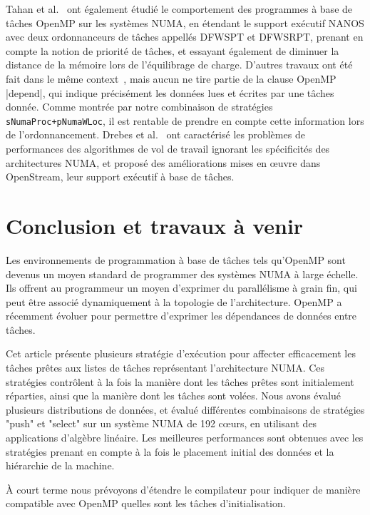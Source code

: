 \documentclass[parallelisme]{compas2016}
\begin{document}
Tahan et al.~\cite{DBLP:journals/corr/Tahan14} ont également étudié le comportement
des programmes à base de tâches OpenMP sur les systèmes NUMA, en étendant le
support exécutif NANOS avec deux ordonnanceurs de tâches appellés DFWSPT et DFWSRPT,
prenant en compte la notion de priorité de tâches, et essayant également de diminuer
la distance de la mémoire lors de l'équilibrage de charge.
D'autres travaux ont été fait dans le même context~\cite{DBLP:conf/europar/TerbovenSCM12,DBLP:journals/corr/abs-1101-0093},
mais aucun ne tire partie de la clause OpenMP |depend|, qui indique précisément les
données lues et écrites par une tâches donnée. Comme montrée par notre combinaison
de stratégies \verb/sNumaProc+pNumaWLoc/, il est rentable de prendre en compte
cette information lors de l'ordonnancement.
Drebes et al.~\cite{LIP610333} ont caractérisé les problèmes de performances des
algorithmes de vol de travail ignorant les spécificités des architectures NUMA,
et proposé des améliorations mises en œuvre dans OpenStream, leur support exécutif à base de tâches.


\section{Conclusion et travaux à venir}

Les environnements de programmation à base de tâches tels qu'OpenMP sont devenus
un moyen standard de programmer des systèmes NUMA à large échelle.
Ils offrent au programmeur un moyen d'exprimer du parallélisme à grain fin,
qui peut être associé dynamiquement à la topologie de l'architecture.
OpenMP a récemment évoluer pour permettre d'exprimer les dépendances de données
entre tâches.

Cet article présente plusieurs stratégie d'exécution pour affecter efficacement
les tâches prêtes aux listes de tâches représentant l'architecture NUMA.
Ces stratégies contrôlent à la fois la manière dont les tâches prêtes sont
initialement réparties, ainsi que la manière dont les tâches sont volées.
Nous avons évalué plusieurs distributions de données, et évalué différentes
combinaisons de stratégies "push" et "select" sur un système NUMA de 192 cœurs,
en utilisant des applications d'algèbre linéaire.
Les meilleures performances sont obtenues avec les stratégies prenant en compte à
la fois le placement initial des données et la hiérarchie de la machine.

À court terme nous prévoyons d'étendre le compilateur pour indiquer de manière
compatible avec OpenMP quelles sont les tâches d'initialisation.
\end{document}
